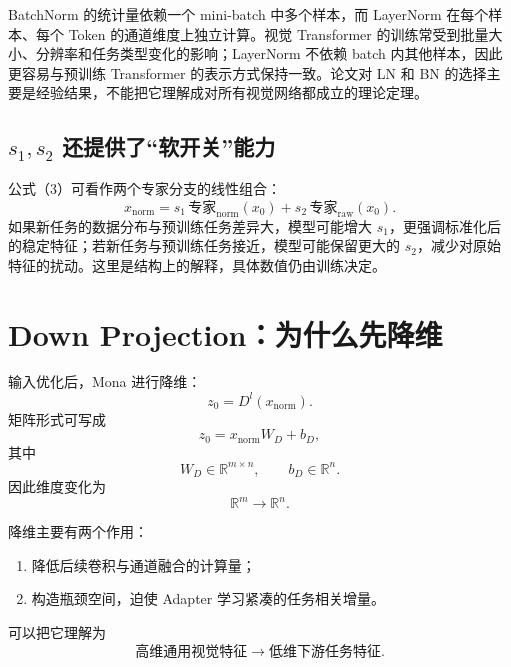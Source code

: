 \documentclass[UTF8,12pt,a4paper,fontset=none]{ctexart}
\newcommand{\R}{\mathbb{R}}
\begin{document}
BatchNorm 的统计量依赖一个 mini-batch 中多个样本，而 LayerNorm 在每个样本、每个 Token 的通道维度上独立计算。视觉 Transformer 的训练常受到批量大小、分辨率和任务类型变化的影响；LayerNorm 不依赖 batch 内其他样本，因此更容易与预训练 Transformer 的表示方式保持一致。论文对 LN 和 BN 的选择主要是经验结果，不能把它理解成对所有视觉网络都成立的理论定理。

\subsection{\texorpdfstring{$s_1,s_2$}{s1, s2} 还提供了“软开关”能力}

公式（3）可看作两个专家分支的线性组合：
\begin{equation}
 x_{\mathrm{norm}}=s_1\,\text{专家}_{\mathrm{norm}}(x_0)+s_2\,\text{专家}_{\mathrm{raw}}(x_0).
\end{equation}
如果新任务的数据分布与预训练任务差异大，模型可能增大 $s_1$，更强调标准化后的稳定特征；若新任务与预训练任务接近，模型可能保留更大的 $s_2$，减少对原始特征的扰动。这里是结构上的解释，具体数值仍由训练决定。

\section{Down Projection：为什么先降维}

输入优化后，Mona 进行降维：
\begin{equation}
 z_0=D^l(x_{\mathrm{norm}}).
\end{equation}
矩阵形式可写成
\begin{equation}
 z_0=x_{\mathrm{norm}}W_D+b_D,
\end{equation}
其中
\begin{equation}
 W_D\in\R^{m\times n},\qquad b_D\in\R^n.
\end{equation}
因此维度变化为
\begin{equation}
 \R^m\longrightarrow\R^n.
\end{equation}

降维主要有两个作用：
\begin{enumerate}
  \item 降低后续卷积与通道融合的计算量；
  \item 构造瓶颈空间，迫使 Adapter 学习紧凑的任务相关增量。
\end{enumerate}

可以把它理解为
\begin{equation}
 \text{高维通用视觉特征}
 \longrightarrow
 \text{低维下游任务特征}.
\end{equation}
\end{document}
